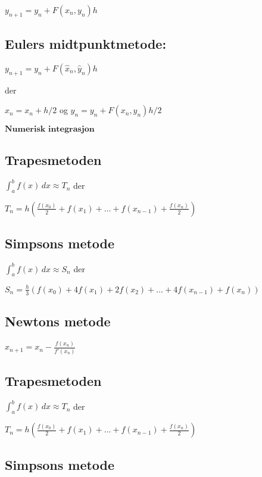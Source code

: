 \documentclass[a4paper,7pt,fleqn]{article}
\begin{document}
\( y_{n+1} = y_n + F(x_n, y_n) h \)  

\subsection{Eulers midtpunktmetode:}  

\( y_{n+1} = y_n + F(\hat{x}_n, \hat{y}_n) h \)  

der  

\( \hat{x}_n = x_n + h/2 \) og \( \hat{y}_n = y_n + F(x_n, y_n) h/2 \)  

\(\textbf{Numerisk integrasjon}\)  

\subsection{Trapesmetoden}  

\(\int_{a}^{b} f(x) \,dx \approx T_n\) der  

\( T_n = h \left( \frac{f(x_0)}{2} + f(x_1) + \dots + f(x_{n-1}) + \frac{f(x_n)}{2} \right) \)  

\subsection{Simpsons metode}  

\(\int_{a}^{b} f(x) \,dx \approx S_n\) der  

\( S_n = \frac{h}{3} \left( f(x_0) + 4f(x_1) + 2f(x_2) + \dots + 4f(x_{n-1}) + f(x_n) \right) \)  



\subsection{Newtons metode}  

\( x_{n+1} = x_n - \frac{f(x_n)}{f'(x_n)} \)  



\subsection{Trapesmetoden}  

\(\int_{a}^{b} f(x) \,dx \approx T_n\) der  

\( T_n = h \left( \frac{f(x_0)}{2} + f(x_1) + \dots + f(x_{n-1}) + \frac{f(x_n)}{2} \right) \)  

\subsection{Simpsons metode}  
\end{document}
